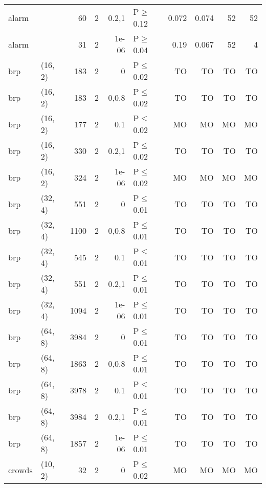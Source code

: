 \begin{longtable}{llrrrlrrrr}
 alarm         &          &     	60 &   2 & 0.2,1 & P$\geq$0.12  & 0.072    & 0.074    & 52      & 52     \\
 alarm         &          &     	31 &   2 & 1e-06 & P$\geq$0.04  & 0.19     & 0.067    & 52      & 4      \\
 brp           & (16, 2)  &    	183 &   2 & 0     & P$\leq$0.02  & TO       & TO       & TO      & TO     \\
 brp           & (16, 2)  &    	183 &   2 & 0,0.8 & P$\leq$0.02  & TO       & TO       & TO      & TO     \\
 brp           & (16, 2)  &    	177 &   2 & 0.1   & P$\leq$0.02  & MO       & MO       & MO      & MO     \\
 brp           & (16, 2)  &    	330 &   2 & 0.2,1 & P$\leq$0.02  & TO       & TO       & TO      & TO     \\
 brp           & (16, 2)  &    	324 &   2 & 1e-06 & P$\leq$0.02  & MO       & MO       & MO      & MO     \\
 brp           & (32, 4)  &    	551 &   2 & 0     & P$\leq$0.01  & TO       & TO       & TO      & TO     \\
 brp           & (32, 4)  &   	1100 &   2 & 0,0.8 & P$\leq$0.01  & TO       & TO       & TO      & TO     \\
 brp           & (32, 4)  &    	545 &   2 & 0.1   & P$\leq$0.01  & TO       & TO       & TO      & TO     \\
 brp           & (32, 4)  &    	551 &   2 & 0.2,1 & P$\leq$0.01  & TO       & TO       & TO      & TO     \\
 brp           & (32, 4)  &   	1094 &   2 & 1e-06 & P$\leq$0.01  & TO       & TO       & TO      & TO     \\
 brp           & (64, 8)  &   	3984 &   2 & 0     & P$\leq$0.01  & TO       & TO       & TO      & TO     \\
 brp           & (64, 8)  &   	1863 &   2 & 0,0.8 & P$\leq$0.01  & TO       & TO       & TO      & TO     \\
 brp           & (64, 8)  &   	3978 &   2 & 0.1   & P$\leq$0.01  & TO       & TO       & TO      & TO     \\
 brp           & (64, 8)  &   	3984 &   2 & 0.2,1 & P$\leq$0.01  & TO       & TO       & TO      & TO     \\
 brp           & (64, 8)  &   	1857 &   2 & 1e-06 & P$\leq$0.01  & TO       & TO       & TO      & TO     \\
 crowds        & (10, 2)  &     	32 &   2 & 0     & P$\leq$0.02  & MO       & MO       & MO      & MO     \\

\end{longtable}
